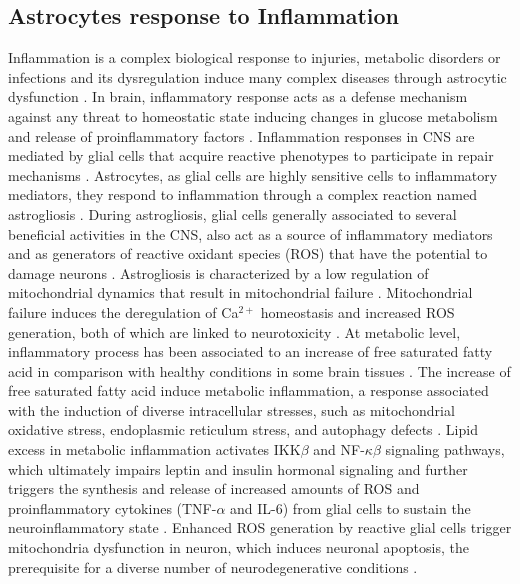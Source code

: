 \subsection*{Astrocytes response to Inflammation}
Inflammation is a complex biological response to injuries, metabolic disorders or infections and its dysregulation induce many complex diseases through astrocytic dysfunction \cite{Masel2010,Yan2013,Jha2016}. In brain, inflammatory response acts as a defense mechanism against any threat to homeostatic state inducing changes in glucose metabolism and release of proinflammatory factors \cite{Allaman2011}. 
Inflammation responses in CNS are mediated by glial cells that acquire reactive phenotypes to participate in repair mechanisms \cite{Takuma2004,Fitch2008,Jha2016}. Astrocytes, as glial cells are highly sensitive cells to inflammatory mediators, they respond to inflammation through a complex reaction named astrogliosis \cite{Dowell2009a}. During astrogliosis, glial cells generally associated to several beneficial activities in the CNS, also act as a source of inflammatory mediators and as generators of reactive oxidant species (ROS) that have the potential to damage neurons \cite{Molofsk2012}. Astrogliosis is characterized by a low regulation of mitochondrial dynamics that result in mitochondrial failure \cite{Sidoryk-Wegrzynowicz2013}.  
Mitochondrial failure induces the deregulation of Ca$^{2+}$ homeostasis and increased ROS generation, both of which are linked to neurotoxicity \cite{Lange2012}. At metabolic level, inflammatory process has been associated to an increase of free saturated fatty acid in comparison with healthy conditions in some brain tissues \cite{Gupta2012}. The increase of free saturated fatty acid induce metabolic inflammation, a response associated with the induction of diverse intracellular stresses, such as mitochondrial oxidative stress, endoplasmic reticulum stress, and autophagy defects \cite{Jha2016}. 
Lipid excess in metabolic inflammation activates IKK$\beta$ and NF-$\kappa\beta$ signaling pathways, which ultimately impairs leptin and insulin hormonal signaling and further triggers the synthesis and release of increased amounts of ROS and proinflammatory cytokines (TNF-$\alpha$ and IL-6) from glial cells to sustain the neuroinflammatory state \cite{Purkayastha2015}. Enhanced ROS generation by reactive glial cells trigger mitochondria dysfunction in neuron, which induces neuronal apoptosis, the prerequisite for a diverse number of neurodegenerative conditions \cite{K.2006}.

